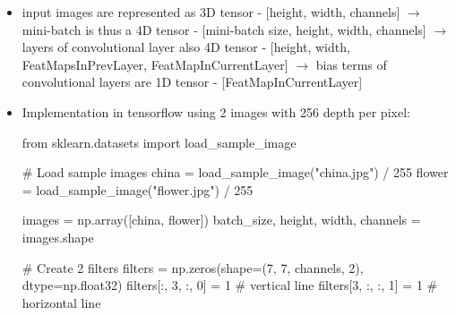\documentclass[12pt,a4paper]{article}
\begin{document}
\begin{itemize}
  \item input images are represented as 3D tensor - [height, width, channels]
  \newline \indent $\longrightarrow$ mini-batch is thus a 4D tensor - [mini-batch size, height, width, channels]
  \newline \indent $\longrightarrow$ layers of convolutional layer also 4D tensor - [height, width, FeatMapsInPrevLayer, FeatMapInCurrentLayer]
  \newline \indent $\longrightarrow$ bias terms of convolutional layers are 1D tensor - [FeatMapInCurrentLayer]
  \item Implementation in tensorflow using 2 images with 256 depth per pixel:

  \begin{python}
  from sklearn.datasets import load_sample_image
  
  # Load sample images
  china = load_sample_image("china.jpg") / 255
  flower = load_sample_image("flower.jpg") / 255
  
  images = np.array([china, flower])
  batch_size, height, width, channels = images.shape
  
  # Create 2 filters
  filters = np.zeros(shape=(7, 7, channels, 2), dtype=np.float32)
  filters[:, 3, :, 0] = 1 # vertical line
  filters[3, :, :, 1] = 1 # horizontal line
  

\end{python}
\end{itemize}
\end{document}
